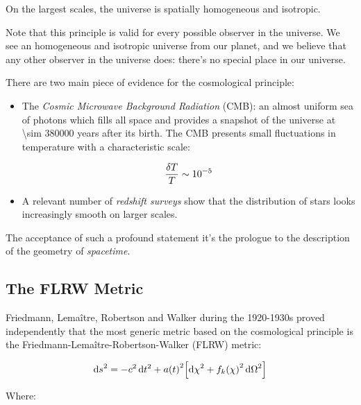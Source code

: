 \begin{principle}
        On the largest scales, the universe is spatially homogeneous and isotropic.
\end{principle}

Note that this principle is valid for every possible observer in the
universe. We see an homogeneous and isotropic universe from our planet, and
we believe that any other observer in the universe does: there's no special
place in our universe.

There are two main piece of evidence for the cosmological principle:

\begin{itemize}
        \item The \emph{Cosmic Microwave Background Radiation} (CMB): an almost
        uniform sea of photons which fills all space and provides a snapshot of the
        universe at \num{\sim 380000} years after its birth. The CMB
        presents small fluctuations in temperature with a characteristic
        scale:

        \begin{equation}
                \frac{\var{T}}{T} \sim \num{e-5}
        \end{equation}

        \item A relevant number of \emph{redshift surveys} show that the
        distribution of stars looks increasingly smooth on larger scales.
\end{itemize}

The acceptance of such a profound statement it's the prologue to the
description of the geometry of \emph{spacetime}.

\subsection{The FLRW Metric}\label{ss:flrw}

Friedmann, Lema\^itre, Robertson and Walker during the 1920-1930s proved
independently that the most generic metric based on the cosmological
principle is the Friedmann-Lema\^itre-Robertson-Walker (FLRW) metric:

\begin{equation}
        \dd{s}^2 = -c^2\dd{t^2} + a\qty(t)^2\qty[\dd{\chi}^2 +
        f_k\qty(\chi)^2\dd{\Omega}^2]
        \label{eq:flrw}
\end{equation}

Where:

